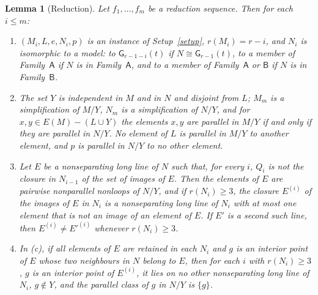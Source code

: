 \documentclass[11pt]{amsart}
\newtheorem{lemma}[theorem]{Lemma}
\theoremstyle{definition}
\theoremstyle{remark}
\numberwithin{equation}{section}
\newcommand{\GW}{\mathsf{G}}
\newcommand{\FA}{\mathsf{A}}
\newcommand{\FB}{\mathsf{B}}
\begin{document}
\begin{lemma}[Reduction]\label{lem:reduction}
Let $f_1,\dots,f_m$ be a reduction sequence. Then for each $i\le m$:
\begin{enumerate}[label=\textup{(\alph*)}]
\item $(M_i,L,e,N_i,p)$ is an instance of Setup~\textup{\ref{setup}}, $r(M_i)=r-i$, and $N_i$ is isomorphic to a model: to $\GW_{r-1-i}(t)$ if $N\cong\GW_{r-1}(t)$, to a member of Family~$\FA$ if $N$ is in Family~$\FA$, and to a member of Family~$\FA$ or $\FB$ if $N$ is in Family~$\FB$.
\item The set $Y$ is independent in $M$ and in $N$ and disjoint from $L$; $M_m$ is a simplification of $M/Y$, $N_m$ is a simplification of $N/Y$, and for $x,y\in E(M)-(L\cup Y)$ the elements $x,y$ are parallel in $M/Y$ if and only if they are parallel in $N/Y$. No element of $L$ is parallel in $M/Y$ to another element, and $p$ is parallel in $N/Y$ to no other element.
\item Let $E$ be a nonseparating long line of $N$ such that, for every $i$, $Q_i$ is not the closure in $N_{i-1}$ of the set of images of $E$. Then the elements of $E$ are pairwise nonparallel nonloops of $N/Y$, and if $r(N_i)\ge3$, the closure $E^{(i)}$ of the images of $E$ in $N_i$ is a nonseparating long line of $N_i$ with at most one element that is not an image of an element of $E$. If $E'$ is a second such line, then $E^{(i)}\ne E'^{(i)}$ whenever $r(N_i)\ge3$.
\item In \textup{(c)}, if all elements of $E$ are retained in each $N_i$ and $g$ is an interior point of $E$ whose two neighbours in $N$ belong to $E$, then for each $i$ with $r(N_i)\ge3$, $g$ is an interior point of $E^{(i)}$, it lies on no other nonseparating long line of $N_i$, $g\notin Y$, and the parallel class of $g$ in $N/Y$ is $\{g\}$.
\end{enumerate}
\end{lemma}
\end{document}
